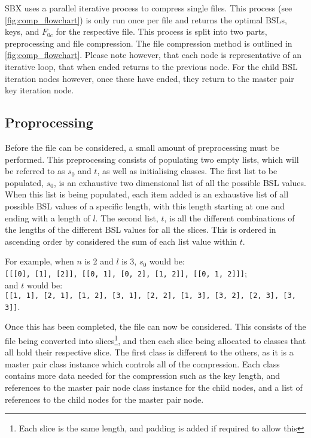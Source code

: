 \documentclass{hehe}
\begin{document}
SBX uses a parallel iterative process to compress single files. This process (see \cref{fig:comp_flowchart}) is only run once per file and returns the optimal BSLs, keys, and $F_{0c}$ for the respective file. This process is split into two parts, preprocessing and file compression. The file compression method is outlined in \cref{fig:comp_flowchart}. Please note however, that each node is representative of an iterative loop, that when ended returns to the previous node. For the child BSL iteration nodes however, once these have ended, they return to the master pair key iteration node.

\subsection{Proprocessing}

Before the file can be considered, a small amount of preprocessing must be performed. This preprocessing consists of populating two empty lists, which will be referred to as $s_0$ and $t$, as well as initialising classes. The first list to be populated, $s_0$, is an exhaustive two dimensional list of all the possible BSL values. When this list is being populated, each item added is an exhaustive list of all possible BSL values of a specific length, with this length starting at one and ending with a length of $l$. The second list, $t$, is all the different combinations of the lengths of the different BSL values for all the slices. This is ordered in ascending order by considered the sum of each list value within $t$.

For example, when $n$ is 2 and $l$ is 3, $s_0$ would be:\\\texttt{[[[0], [1], [2]], [[0, 1], [0, 2], [1, 2]], [[0, 1, 2]]]};\\and $t$ would be:\\\texttt{[[1, 1], [2, 1], [1, 2], [3, 1], [2, 2], [1, 3], [3, 2], [2, 3], [3, 3]]}.

Once this has been completed, the file can now be considered. This consists of the file being converted into slices\footnote{Each slice is the same length, and padding is added if required to allow this}, and then each slice being allocated to classes that all hold their respective slice. The first class is different to the others, as it is a master pair class instance which controls all of the compression. Each class contains more data needed for the compression such as the key length, and references to the master pair node class instance for the child nodes, and a list of references to the child nodes for the master pair node.
\end{document}
